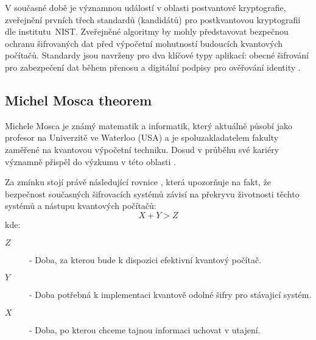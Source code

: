 V současné době je významnou událostí v oblasti postvantové kryptografie, zveřejnění prvních třech standardů (kandidátů) pro postkvantovou kryptografii dle institutu~NIST. Zveřejněné algoritmy by mohly představovat bezpečnou ochranu šifrovaných dat před výpočetní mohutností budoucích kvantových počítačů. Standardy jsou navrženy pro dva klíčové typy aplikací: obecné šifrování pro zabezpečení dat během přenosu a digitální podpisy pro ověřování identity \parencite{nist2024}.

\subsection{Michel Mosca theorem}
Michele Mosca je známý matematik a informatik, který aktuálně působí jako profesor na Univerzitě ve Waterloo (USA) a je spoluzakladatelem fakulty zaměřené na kvantovou výpočetní techniku. Dosud v průběhu své kariéry významně přispěl do výzkumu v této oblasti \parencite{mosca2023}.

Za zmínku stojí právě následující rovnice \textcite{mosca2023}, která upozorňuje na fakt, že bezpečnost současných šifrovacích systémů závisí na překryvu životnosti těchto systémů a nástupu kvantových počítačů:
\begin{equation}
X + Y > Z
\end{equation}
kde:
\begin {description}
\item[$Z$] - Doba, za kterou bude k dispozici efektivní kvantový počítač.
\item[$Y$] - Doba potřebná k implementaci kvantově odolné šifry pro stávajicí systém.
\item[$X$] - Doba, po kterou chceme tajnou informaci uchovat v utajení.
\end {description}
\newpage